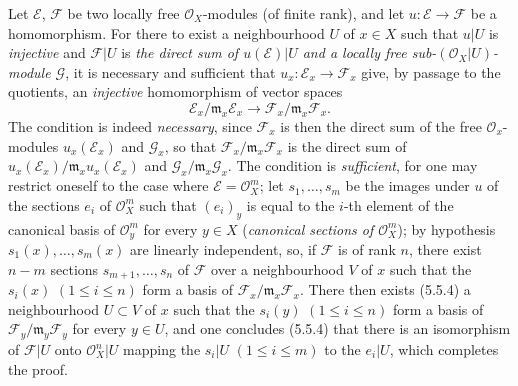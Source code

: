\begin{env}[5.5.5]
\label{0.5.5.5}
Let $\mathcal{E}$, $\mathcal{F}$ be two locally free $\mathcal{O}_X$-modules
(of finite rank), and let $u:\mathcal{E}\to\mathcal{F}$ be a
homomorphism. For there to exist a neighbourhood $U$ of $x\in X$ such that $u|U$
is \emph{injective} and $\mathcal{F}|U$ is \emph{the direct sum of
$u(\mathcal{E})|U$ and a locally free sub-$(\mathcal{O}_X|U)$-module
$\mathcal{G}$}, it is necessary and sufficient that
$u_x:\mathcal{E}_x\to\mathcal{F}_x$ give, by passage to the quotients, an
\emph{injective} homomorphism of vector spaces
\[
  \mathcal{E}_x/\mathfrak{m}_x\mathcal{E}_x
  \longrightarrow
  \mathcal{F}_x/\mathfrak{m}_x\mathcal{F}_x.
\]
The condition is indeed \emph{necessary}, since $\mathcal{F}_x$ is then
the direct sum of the free $\mathcal{O}_x$-modules $u_x(\mathcal{E}_x)$ and
$\mathcal{G}_x$, so that $\mathcal{F}_x/\mathfrak{m}_x\mathcal{F}_x$ is the
direct sum of
$u_x(\mathcal{E}_x)/\mathfrak{m}_x u_x(\mathcal{E}_x)$ and
$\mathcal{G}_x/\mathfrak{m}_x\mathcal{G}_x$. The condition is
\emph{sufficient}, for one may restrict oneself to the case where
$\mathcal{E}=\mathcal{O}_X^m$; let $s_1,\ldots,s_m$ be the images under $u$ of the
sections $e_i$ of $\mathcal{O}_X^m$ such that $(e_i)_y$ is equal to the $i$-th
element of the canonical basis of $\mathcal{O}_y^m$ for every $y\in X$
(\emph{canonical sections of $\mathcal{O}_X^m$}); by hypothesis
$s_1(x),\ldots,s_m(x)$ are linearly independent, so, if $\mathcal{F}$
is of rank $n$, there exist $n-m$ sections $s_{m+1},\ldots,s_n$ of
$\mathcal{F}$ over a neighbourhood $V$ of $x$ such that the $s_i(x)$
$(1\leq i\leq n)$ form a basis of
$\mathcal{F}_x/\mathfrak{m}_x\mathcal{F}_x$. There then exists (5.5.4) a
neighbourhood $U\subset V$ of $x$ such that the $s_i(y)$ $(1\leq i\leq n)$ form
a basis of $\mathcal{F}_y/\mathfrak{m}_y\mathcal{F}_y$ for every $y\in U$,
and one concludes (5.5.4) that there is an isomorphism of $\mathcal{F}|U$ onto
$\mathcal{O}_X^n|U$ mapping the $s_i|U$ $(1\leq i\leq m)$ to the
$e_i|U$, which completes the proof.
\end{env}

